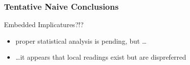 \documentclass[fleqn,10pt,serif,xcolor=dvipsnames]{beamer}
\begin{document}
\begin{frame}
  \frametitle{Tentative Naive Conclusions}
  \begin{block}{Embedded Implicatures?!?}
    \begin{itemize}
    \item proper statistical analysis is pending, but \dots
    \item \dots it appears that local readings exist but are dispreferred
    \end{itemize}
  \end{block}
\end{frame}



\begin{frame}

    \printbibliography[heading=subbibliography]

\end{frame}
\end{document}
